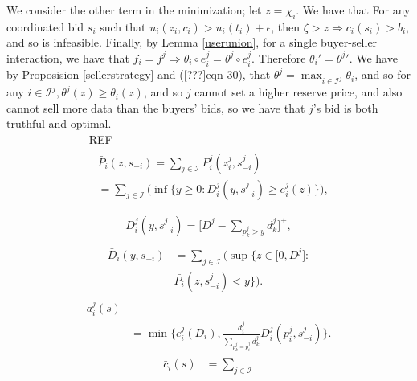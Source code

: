 \documentclass[12pt]{article}
\theoremstyle{definition}
\newcommand{\mcI}{\mathcal{I}}
\begin{document}
\begin{multicols}{2}
We consider the other term in the minimization; let $z=\chi_i$. We have that
For any coordinated bid $s_i$ such that $u_i(z_i, c_i) > u_i(t_i)+
\epsilon$, then $\zeta > z
\Rightarrow c_i(s_{i}) > b_i$, and so is infeasible. 
Finally, by Lemma \ref{userunion}, for a single buyer-seller interaction, we
have that $f_i = f^j \Rightarrow \theta_i \circ e_i^j = \theta^j \circ e_i^j$.
Therefore $\theta_i' = {\theta^j}'$. We have by Proposision
\ref{sellerstrategy} and (\ref{???}eqn 30), that $\theta^j = \max_{i\in\mcI^j}
\theta_i$, and so for any $i\in\mcI^j, \theta^j(z) \ge \theta_i(z)$, and so $j$
cannot set a higher reserve price, and also cannot sell more data than the buyers'
bids, so we have that $j$'s bid is both truthful and optimal.
\\----------------------REF-------------------------\\
\begin{align}
\begin{split}
    &\bar{P}_i(z, s_{-i}) =\displaystyle\sum_{j\in\mcI}P_i^j(z_i^j,
s_{-i}^j) \\
    &= \sum_{j\in\mcI}\bigg(\inf\bigg\lbrace y\ge 0 : 
    {D_i^j}(y,s_{-i}^j) \ge e_i^j(z) \bigg\rbrace \bigg),\\
\end{split}
\end{align}
\begin{align}
\begin{split}
    D_i^j(y,s_{-i}^j) = \bigg\lbrack D^j - \sum_{p_k^j> y} d_k^j\bigg\rbrack^+,
\end{split}
\end{align}
\begin{align}\label{datapriceinverse}
\begin{split}
    \bar{D}_i(y, s_{-i}) &= \displaystyle\sum_{j\in\mcI}\bigg(\sup\bigg\lbrace z\in \big[ 0,
    D^j \big] : \\
    &\bar{P_i}(z,s_{-i}^j) < y\bigg\rbrace\bigg).
\end{split}
\end{align}
\begin{align}
    a_i^j(s) \\
    &= \min\bigg\lbrace e_i^j(D_i),
    \frac{d_i^j}{\sum_{p_k^j= p_i^j}d_k^j} D_i^j(p_i^j,s_{-i}^j)\bigg\rbrace.
\end{align}
\begin{align}
\begin{split}
    \bar{c}_i(s) &= \displaystyle\sum_{j\in\mcI} 

\end{split}
\end{align}
\end{multicols}
\end{document}
